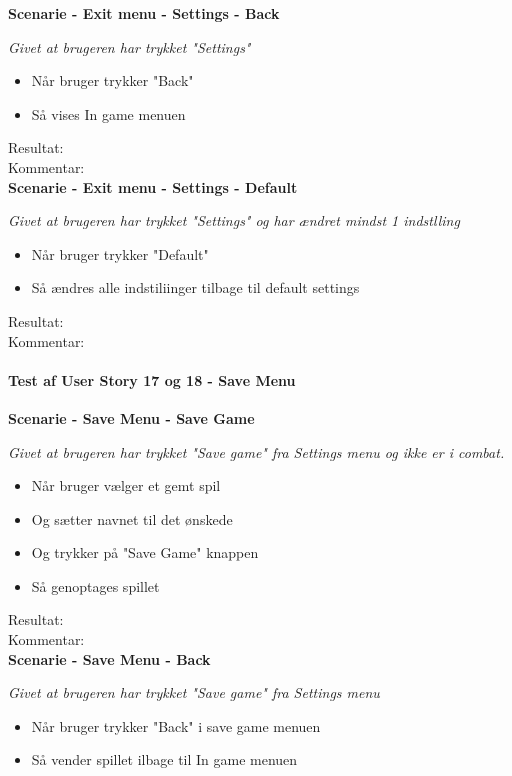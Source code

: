 \bf{Scenarie - Exit menu - Settings - Back}

\it{Givet at brugeren har trykket "Settings"}

\begin{itemize}
  \item Når bruger trykker "Back"
  \item Så vises In game menuen
\end{itemize}

Resultat:\\
Kommentar:\\

\bf{Scenarie - Exit menu - Settings - Default}

\it{Givet at brugeren har trykket "Settings" og har ændret mindst 1 indstlling}

\begin{itemize}
  \item Når bruger trykker "Default"
  \item Så ændres alle indstiliinger tilbage til default settings
\end{itemize}

Resultat:\\
Kommentar:\\

\paragraph{Test af User Story 17 og 18 - Save Menu}

\bf{Scenarie - Save Menu - Save Game}

\it{Givet at brugeren har trykket "Save game" fra Settings menu og ikke er i combat.}

\begin{itemize}
  \item Når bruger vælger et gemt spil
  \item Og sætter navnet til det ønskede
  \item Og trykker på "Save Game" knappen
  \item Så genoptages spillet
\end{itemize}

Resultat:\\
Kommentar:\\

\bf{Scenarie - Save Menu - Back}

\it{Givet at brugeren har trykket "Save game" fra Settings menu}

\begin{itemize}
  \item Når bruger trykker "Back" i save game menuen
  \item Så vender spillet ilbage til In game menuen
\end{itemize}

